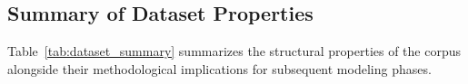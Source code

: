 \subsection{Summary of Dataset Properties}
Table~\ref{tab:dataset_summary} summarizes the structural properties of the corpus alongside their methodological implications for subsequent modeling phases.

